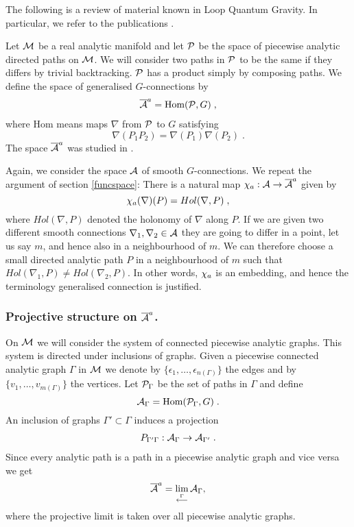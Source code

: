 \documentclass[12pt]{article}
\newcommand{\ba}{\begin{eqnarray}}
\newcommand{\ea}{\end{eqnarray}}
\def\e{\epsilon}
\def\ca{{\cal A}}
\def\cm{{\cal M}}
\def\cp{{\cal P}}
\begin{document}
The following is a review of material known in Loop Quantum Gravity. In particular, we refer to the publications \cite{Ashtekar:1993wf,Ashtekar:1994wa,Marolf:1994cj}.








Let $\cm$ be a real analytic manifold and let $\cp$ be the space of piecewise analytic directed paths on $\cm$. We will consider two paths in $\cp$ to be the same if they differs by trivial backtracking. $\cp$ has a product simply by composing paths. We define the space of generalised $G$-connections by
\ba
\overline{\ca}^{\small a}=\hbox{Hom} (\cp,G)\;,
\label{klo}
\ea
where Hom means maps $\nabla$ from $\cp$ to $G$ satisfying $$\nabla (P_1P_2)=\nabla (P_1)\nabla (P_2)\;.$$ The space $\overline{\ca}^{\small a}$ was studied in \cite{Ashtekar:1994wa}.

Again, we consider the space $\ca$ of smooth $G$-connections. We repeat the argument of section \ref{funcspace}: There is a natural map $\chi_{\small a}:\ca \to \overline{\ca}^{\small a}$ given by 
$$\chi_{\small a} ( \nabla)(P)= Hol(\nabla ,P)\;,$$
where $Hol(\nabla,P)$ denoted the holonomy of $\nabla$ along $P$. 
If we are given two different smooth connections $\nabla_1,\nabla_2\in \ca$ they are going to differ in a point, let us say $m$, and hence also in a neighbourhood of $m$. We can therefore choose a small directed analytic path $P$ in a neighbourhood of $m$ such that $Hol(\nabla_1,P)\not= Hol (\nabla_2,P)$. In other words, $\chi_{\small a}$ is an embedding, and hence the terminology generalised connection is justified.

\subsubsection{Projective structure on $\overline{\ca}^{\small a}$.}

 On $\cm$ we will consider the system  of connected piecewise analytic graphs. This system is directed under inclusions of graphs. Given a piecewise connected analytic graph $\Gamma$ in $\cm$ we denote by $\{ \e_1,\ldots , \e_{n(\Gamma)}\}$ the edges and by $\{ v_1,\ldots, v_{m(\Gamma)}\}$ the vertices.  Let $\cp_\Gamma$ be the set of paths in $\Gamma$ and define 
$$\ca_\Gamma=\hbox{Hom}(\cp_\Gamma, G)\;.$$
An inclusion of graphs $\Gamma' \subset \Gamma$ induces a projection 
\ba
P_{\Gamma' \Gamma}:\ca_\Gamma \to \ca_{\Gamma'}\;.
\label{gogo}
\ea
Since every analytic path is a path in a piecewise analytic graph and vice versa we get
$$\overline{\ca}^{\small a}=\lim_{\stackrel{\Gamma}{\longleftarrow}}\ca_\Gamma ,$$
where the projective limit is taken over all piecewise analytic graphs.
\end{document}

